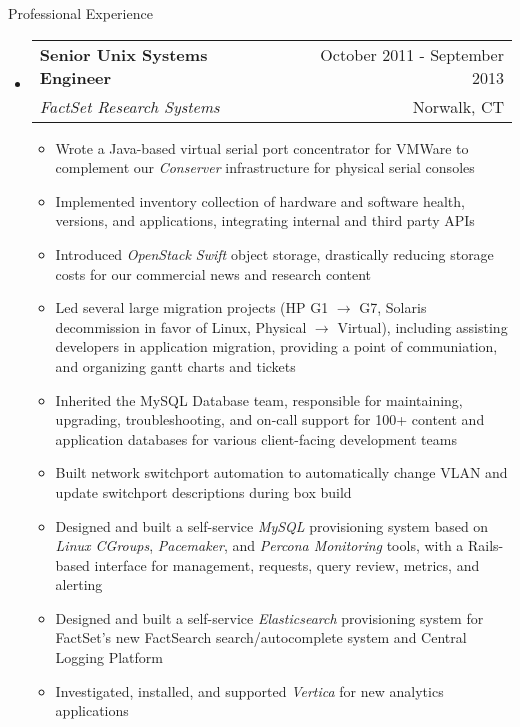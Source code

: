 \documentclass[letterpaper,10pt]{article}
\makeatletter
\newenvironment{ressection}[1]{
	\vspace{4pt}
	{\fontfamily{phv}\selectfont\Large#1}
	\begin{itemize}
	\vspace{3pt}
}{
	\end{itemize}
}
\newcommand{\ressubitem}[1]{
	\vspace{-1pt}
	\item \begin{flushleft} #1 \end{flushleft}
}
\newcommand{\resbigitem}[4]{
	\vspace{-5pt}
	\item
	\begin{tabular*}{6in}{l@{\extracolsep{\fill}}r}
		\textbf{#1} & #2 \\
		\textit{#3} & #4\\
	\end{tabular*}
}
\newenvironment{ressubsec}[4]{
	\resbigitem{#1}{#2}{#3}{#4}
	\vspace{-2pt}
	\begin{itemize}
}{
	\end{itemize}
}
\makeatother
\begin{document}
\begin{ressection}{Professional Experience}
	\begin{ressubsec}{Senior Unix Systems Engineer}{October 2011 - September 2013}{FactSet Research Systems}{Norwalk, CT}
		\ressubitem{Wrote a Java-based virtual serial port concentrator for VMWare to complement our \textit{Conserver} infrastructure for physical serial consoles}
		\ressubitem{Implemented inventory collection of hardware and software health, versions, and applications, integrating internal and third party APIs}
		\ressubitem{Introduced \textit{OpenStack Swift} object storage, drastically reducing storage costs for our commercial news and research content}
		\ressubitem{Led several large migration projects (HP G1 $\rightarrow$ G7, Solaris decommission in favor of Linux, Physical $\rightarrow$ Virtual), including assisting developers in application migration, providing a point of communiation, and organizing gantt charts and tickets}
		\ressubitem{Inherited the MySQL Database team, responsible for maintaining, upgrading, troubleshooting, and on-call support for 100+ content and application databases for various client-facing development teams}
		\ressubitem{Built network switchport automation to automatically change VLAN and update switchport descriptions during box build}
		\ressubitem{Designed and built a self-service \textit{MySQL} provisioning system based on \textit{Linux CGroups}, \textit{Pacemaker}, and \textit{Percona Monitoring} tools, with a Rails-based interface for management, requests, query review, metrics, and alerting}
		\ressubitem{Designed and built a self-service \textit{Elasticsearch} provisioning system for FactSet's new FactSearch search/autocomplete system and Central Logging Platform}
		\ressubitem{Investigated, installed, and supported \textit{Vertica} for new analytics applications}
	\end{ressubsec}


\end{ressection}
\end{document}
